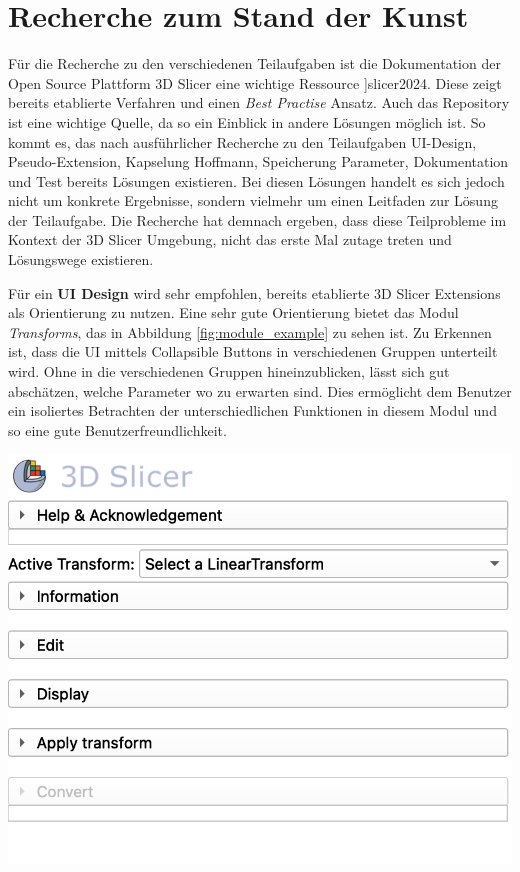 \section{Recherche zum Stand der Kunst}
\label{sec:recherche} Für die Recherche zu den verschiedenen Teilaufgaben ist
die Dokumentation der Open Source Plattform 3D Slicer eine wichtige Ressource
\cite[vgl.]{[}]{slicer2024}. Diese zeigt bereits etablierte Verfahren und einen \textit{Best
Practise} Ansatz. Auch das \citet{extensionsIndex2024} Repository ist eine
wichtige Quelle, da so ein Einblick in andere Lösungen möglich ist. So kommt es,
das nach ausführlicher Recherche zu den Teilaufgaben UI-Design, Pseudo-Extension,
Kapselung Hoffmann, Speicherung Parameter, Dokumentation und Test bereits Lösungen
existieren. Bei diesen Lösungen handelt es sich jedoch nicht um konkrete
Ergebnisse, sondern vielmehr um einen Leitfaden zur Lösung der Teilaufgabe. Die
Recherche hat demnach ergeben, dass diese Teilprobleme im Kontext der 3D Slicer Umgebung,
nicht das erste Mal zutage treten und Lösungswege existieren.

\begin{minipage}{0.40\textwidth}
	Für ein \textbf{UI Design} wird sehr empfohlen, bereits etablierte 3D Slicer Extensions
	als Orientierung zu nutzen. Eine sehr gute Orientierung bietet das Modul
	\textit{Transforms}, das in Abbildung \ref{fig:module_example} zu sehen ist. Zu
	Erkennen ist, dass die UI mittels Collapsible Buttons in verschiedenen Gruppen
	unterteilt wird. Ohne in die verschiedenen Gruppen hineinzublicken, lässt sich
	gut abschätzen, welche Parameter wo zu erwarten sind. Dies ermöglicht dem
	Benutzer ein isoliertes Betrachten der unterschiedlichen Funktionen in diesem
	Modul und so eine gute Benutzerfreundlichkeit.
\end{minipage}
\hfill
\begin{minipage}{0.50\textwidth}
	\centering
	\includegraphics[scale=0.50]{img/modul_example.jpg}
	\label{fig:module_example}
\end{minipage}

